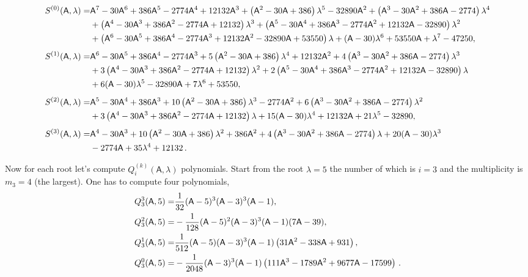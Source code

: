 \documentclass[AMA,STIX1COL]{WileyNJD-v2}
\def\m#1{\mathsf{#1}} %
\def\m#1{\mathsf{#1}}%
\begin{document}
\begin{eexample}
\begin{align}
  S^{(0)}(\m{A},\lambda)=&\m{A}^7-30 \m{A}^6+386 \m{A}^5-2774 \m{A}^4+12132 \m{A}^3+\left(\m{A}^2-30 \m{A}+386\right) \lambda ^5-32890 \m{A}^2+\left(\m{A}^3-30 \m{A}^2+386 \m{A}-2774\right) \lambda ^4\notag\\
  &+\left(\m{A}^4-30 \m{A}^3+386 \m{A}^2-2774
   \m{A}+12132\right) \lambda ^3+\left(\m{A}^5-30 \m{A}^4+386 \m{A}^3-2774 \m{A}^2+12132 \m{A}-32890\right) \lambda ^2\notag\\
  &+\left(\m{A}^6-30 \m{A}^5+386 \m{A}^4-2774 \m{A}^3+12132 \m{A}^2-32890 \m{A}+53550\right) \lambda
   +(\m{A}-30) \lambda ^6+53550 \m{A}+\lambda ^7-47250,\notag \\[4pt]
 S^{(1)}(\m{\m{A}},\lambda)= &\m{A}^6-30 \m{A}^5+386 \m{A}^4-2774 \m{A}^3+5 \left(\m{A}^2-30 \m{A}+386\right) \lambda ^4+12132 \m{A}^2+4 \left(\m{A}^3-30 \m{A}^2+386 \m{A}-2774\right) \lambda ^3\notag\\
  &+3 \left(\m{A}^4-30 \m{A}^3+386 \m{A}^2-2774
   \m{A}+12132\right) \lambda ^2+2 \left(\m{A}^5-30 \m{A}^4+386 \m{A}^3-2774 \m{A}^2+12132 \m{A}-32890\right) \lambda\notag\\
   &+6 (\m{A}-30) \lambda ^5-32890 \m{A}+7 \lambda ^6+53550,\notag\\[4pt]
  S^{(2)}(\m{\m{A}},\lambda)= &\m{A}^5-30 \m{A}^4+386 \m{A}^3+10 \left(\m{A}^2-30 \m{A}+386\right) \lambda ^3-2774 \m{A}^2+6 \left(\m{A}^3-30 \m{A}^2+386 \m{A}-2774\right) \lambda ^2\notag\\
  &+3 \left(\m{A}^4-30 \m{A}^3+386 \m{A}^2-2774 \m{A}+12132\right) \lambda
   +15 (\m{A}-30) \lambda ^4+12132 \m{A}+21 \lambda ^5-32890,\notag\\[4pt]
   S^{(3)}(\m{\m{A}},\lambda)= &\m{A}^4-30 \m{A}^3+10 \left(\m{A}^2-30 \m{A}+386\right) \lambda ^2+386 \m{A}^2+4 \left(\m{A}^3-30 \m{A}^2+386 \m{A}-2774\right) \lambda +20 (\m{A}-30) \lambda ^3\notag\\
   &-2774 \m{A}+35 \lambda ^4+12132\, .\notag
\end{align}

  Now for each root let's compute $Q^{(k)}_{i}(\m{A},\lambda)$ polynomials. Start from the root $\lambda=5$ the number of which is $i=3$ and the multiplicity is $m_3=4$ (the largest).
  One has to compute four polynomials,
\begin{align}
  {Q^{3}_3}(\m{A},5)=&\frac{1}{32} (\m{A}-5)^3 (\m{A}-3)^3 (\m{A}-1),\notag\\
 {Q^{2}_3}(\m{A},5)=&-\frac{1}{128} (\m{A}-5)^2 (\m{A}-3)^3 (\m{A}-1) (7 \m{A}-39),\notag\\
 {Q^{1}_3}(\m{A},5)=&\frac{1}{512} (\m{A}-5) (\m{A}-3)^3 (\m{A}-1) \left(31 \m{A}^2-338 \m{A}+931\right), \notag\\
 {Q^{0}_3}(\m{A},5)=&-\frac{1}{2048}(\m{A}-3)^3 (\m{A}-1) \left(111 \m{A}^3-1789 \m{A}^2+9677 \m{A}-17599\right)\notag\,.
\end{align}


\end{eexample}
\end{document}
